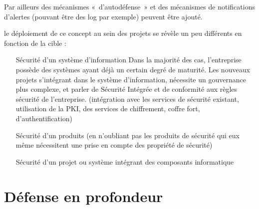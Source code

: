Par ailleurs des mécanismes « d’autodéfense » et des mécanismes de notifications d’alertes (pouvant être des log par exemple) peuvent être ajouté.

le déploiement de ce concept au sein des projets  se révèle un peu différents en fonction de la cible :

\begin{itemize}
	\item  [Sécurité d’un système d’information] Dans la majorité des cas, l’entreprise possède des systèmes ayant déjà un certain degré de maturité. Les nouveaux projets s’intégrant dans le système d’information, nécessite un gouvernance plus complexe, et parler de Sécurité Intégrée et de conformité aux règles sécurité de l’entreprise. (intégration avec les services de sécurité existant, utilisation de la PKI, des services de chiffrement, coffre fort, d’authentification)
	\item [Sécurité d’un produits] (en n’oubliant pas les produits de sécurité qui eux même nécessitent une prise en compte des propriété de sécurité)
	\item [Sécurité d’un projet ou système intégrant des composants informatique]
\end{itemize}

\section{Défense en profondeur}


